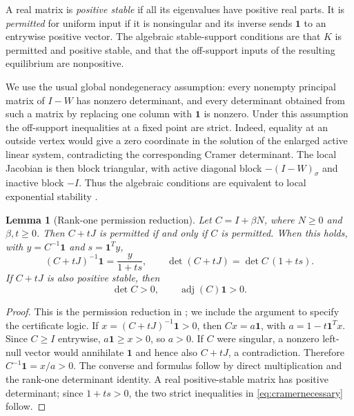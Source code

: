 \documentclass[11pt,a4paper]{article}
\newtheorem{lemma}[theorem]{Lemma}
\theoremstyle{definition}\newtheorem{definition}[theorem]{Definition}
\theoremstyle{remark}\newtheorem{remark}[theorem]{Remark}
\newcommand{\ones}{\mathbf{1}}
\newcommand{\adj}{\operatorname{adj}}
\begin{document}
A real matrix is \emph{positive stable} if all its eigenvalues have positive real parts. It is \emph{permitted} for uniform input if it is nonsingular and its inverse sends $\ones$ to an entrywise positive vector. The algebraic stable-support conditions are that $K$ is permitted and positive stable, and that the off-support inputs of the resulting equilibrium are nonpositive.

We use the usual global nondegeneracy assumption: every nonempty principal matrix of $I-W$ has nonzero determinant, and every determinant obtained from such a matrix by replacing one column with $\ones$ is nonzero. Under this assumption the off-support inequalities at a fixed point are strict. Indeed, equality at an outside vertex would give a zero coordinate in the solution of the enlarged active linear system, contradicting the corresponding Cramer determinant. The local Jacobian is then block triangular, with active diagonal block $-(I-W)_\sigma$ and inactive block $-I$. Thus the algebraic conditions are equivalent to local exponential stability \cite{CGM2019,CGM2024,G2026}.

\begin{lemma}[Rank-one permission reduction]\label{lem:permission}
Let $C=I+\beta N$, where $N\geq0$ and $\beta,t\geq0$. Then $C+tJ$ is permitted if and only if $C$ is permitted. When this holds, with $y=C^{-1}\ones$ and $s=\ones^Ty$,
\begin{equation}\label{eq:permission}
 (C+tJ)^{-1}\ones=\frac{y}{1+ts},\qquad
 \det(C+tJ)=\det C\,(1+ts).
\end{equation}
If $C+tJ$ is also positive stable, then
\begin{equation}\label{eq:cramernecessary}
 \det C>0,\qquad \adj(C)\ones>0.
\end{equation}
\end{lemma}
\begin{proof}
This is the permission reduction in \cite[Lemma 2.1]{G2026}; we include the argument to specify the certificate logic. If $x=(C+tJ)^{-1}\ones>0$, then $Cx=a\ones$, with $a=1-t\ones^Tx$. Since $C\geq I$ entrywise, $a\ones\geq x>0$, so $a>0$. If $C$ were singular, a nonzero left-null vector would annihilate $\ones$ and hence also $C+tJ$, a contradiction. Therefore $C^{-1}\ones=x/a>0$. The converse and formulas follow by direct multiplication and the rank-one determinant identity. A real positive-stable matrix has positive determinant; since $1+ts>0$, the two strict inequalities in \eqref{eq:cramernecessary} follow.
\end{proof}
\end{document}
